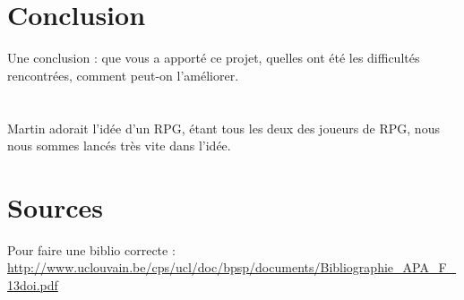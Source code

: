 \documentclass[a4paper,titlepage]{article}
\begin{document}
	\section{Conclusion}
	Une conclusion : que vous a apporté ce projet, quelles ont été les difficultés rencontrées, comment peut-on l’améliorer.\\
	\\
	\\
	Martin adorait l'idée d'un RPG, étant tous les deux des joueurs de RPG, nous nous sommes lancés très vite dans l'idée.
	\clearpage
	\section*{Sources }
	Pour faire une biblio correcte :\\	\url{http://www.uclouvain.be/cps/ucl/doc/bpsp/documents/Bibliographie\_APA\_F\_13doi.pdf}
\end{document}
